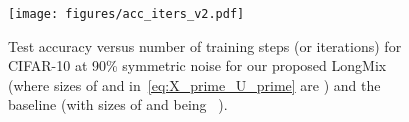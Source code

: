 \documentclass{article}
\begin{document}
\begin{figure}[t]
\centering
\texttt{[image: figures/acc\_iters\_v2.pdf]}
\caption{Test accuracy versus number of training steps (or iterations) for CIFAR-10 at 90\% symmetric noise for our proposed LongMix (where sizes of  and  in~\eqref{eq:X_prime_U_prime} are ) and the baseline (with sizes of  and  being ~\cite{li2020dividemix}).
}

\label{fig:acc_iters}
\vspace{-.15in}
\end{figure}


\begin{table*}[ht]
\centering
\footnotesize
{}
\end{table*}
\end{document}
